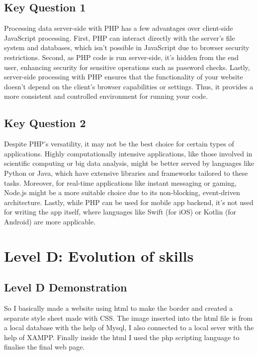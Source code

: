 \documentclass[a4paper, 11pt]{report}
\begin{document}
\subsection{Key Question 1}
Processing data server-side with PHP has a few advantages over client-side JavaScript processing. First, PHP can interact directly with the server's file system and databases, which isn't possible in JavaScript due to browser security restrictions. Second, as PHP code is run server-side, it's hidden from the end user, enhancing security for sensitive operations such as password checks. Lastly, server-side processing with PHP ensures that the functionality of your website doesn't depend on the client's browser capabilities or settings. Thus, it provides a more consistent and controlled environment for running your code\cite{Vs}.

\subsection{Key Question 2}
Despite PHP's versatility, it may not be the best choice for certain types of applications. Highly computationally intensive applications, like those involved in scientific computing or big data analysis, might be better served by languages like Python or Java, which have extensive libraries and frameworks tailored to these tasks. Moreover, for real-time applications like instant messaging or gaming, Node.js might be a more suitable choice due to its non-blocking, event-driven architecture. Lastly, while PHP can be used for mobile app backend, it's not used for writing the app itself, where languages like Swift (for iOS) or Kotlin (for Android) are more applicable.



\newpage
\section{Level D: Evolution of skills}
\vspace{5mm}
\subsection{Level D Demonstration}
So I basically made a website using html to make the border and created a separate style sheet made with CSS. The image inserted into the html file is from a local database with the help of Mysql, I also connected to a local sever with the help of XAMPP. Finally inside the html I used the php scripting language to finalise the final web page.
\end{document}
